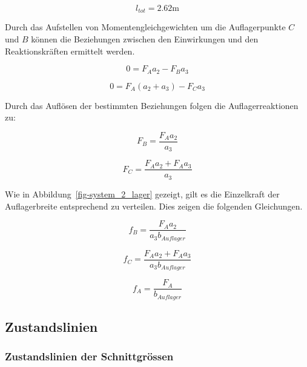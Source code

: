 \documentclass[
  12pt,
  letterpaper,
  egregdoesnotlikesansseriftitles]{scrreprt}
\begin{document}
\begin{equation}l_{tot} = 2.62 \text{m}\end{equation}

Durch das Aufstellen von Momentengleichgewichten um die Auflagerpunkte
\(C\) und \(B\) können die Beziehungen zwischen den Einwirkungen und den
Reaktionskräften ermittelt werden.

\begin{equation}0 = F_{A} a_{2} - F_{B} a_{3}\end{equation}

\begin{equation}0 = F_{A} \left(a_{2} + a_{3}\right) - F_{C} a_{3}\end{equation}

Durch das Auflösen der bestimmten Beziehungen folgen die
Auflagerreaktionen zu:

\begin{equation}F_{B} = \frac{F_{A} a_{2}}{a_{3}}\end{equation}

\begin{equation}F_{C} = \frac{F_{A} a_{2} + F_{A} a_{3}}{a_{3}}\end{equation}

Wie in Abbildung~\ref{fig-system_2_lager} gezeigt, gilt es die
Einzelkraft der Auflagerbreite entsprechend zu verteilen. Dies zeigen
die folgenden Gleichungen.

\begin{equation}f_{B} = \frac{F_{A} a_{2}}{a_{3} b_{Auflager}}\end{equation}

\begin{equation}f_{C} = \frac{F_{A} a_{2} + F_{A} a_{3}}{a_{3} b_{Auflager}}\end{equation}

\begin{equation}f_{A} = \frac{F_{A}}{b_{Auflager}}\end{equation}

\hypertarget{zustandslinien}{%
\subsection{Zustandslinien}\label{zustandslinien}}

\hypertarget{zustandslinien-der-schnittgruxf6ssen}{%
\subsubsection{Zustandslinien der
Schnittgrössen}\label{zustandslinien-der-schnittgruxf6ssen}}
\end{document}

